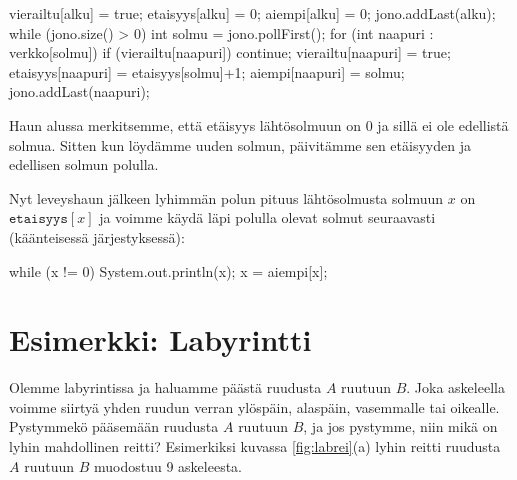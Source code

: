 \begin{code}
vierailtu[alku] = true;
etaisyys[alku] = 0;
aiempi[alku] = 0;
jono.addLast(alku);
while (jono.size() > 0) {
    int solmu = jono.pollFirst();
    for (int naapuri : verkko[solmu]) {
        if (vierailtu[naapuri]) continue;
        vierailtu[naapuri] = true;
        etaisyys[naapuri] = etaisyys[solmu]+1;
        aiempi[naapuri] = solmu;
        jono.addLast(naapuri);
    }
}
\end{code}

Haun alussa merkitsemme, että etäisyys lähtösolmuun on 0
ja sillä ei ole edellistä solmua.
Sitten kun löydämme uuden solmun, päivitämme sen etäisyyden
ja edellisen solmun polulla.

Nyt leveyshaun jälkeen lyhimmän polun pituus lähtösolmusta
solmuun $x$ on $\texttt{etaisyys}[x]$ ja voimme käydä läpi polulla
olevat solmut seuraavasti (käänteisessä järjestyksessä):

\begin{code}
while (x != 0) {
    System.out.println(x);
    x = aiempi[x];
}
\end{code}

\section{Esimerkki: Labyrintti}

Olemme labyrintissa ja haluamme päästä ruudusta $A$ ruutuun $B$.
Joka askeleella voimme siirtyä yhden ruudun verran ylöspäin, alaspäin,
vasemmalle tai oikealle.
Pystymmekö pääsemään ruudusta $A$ ruutuun $B$, ja jos pystymme, niin
mikä on lyhin mahdollinen reitti?
Esimerkiksi kuvassa \ref{fig:labrei}(a) lyhin reitti
ruudusta $A$ ruutuun $B$ muodostuu 9 askeleesta.

